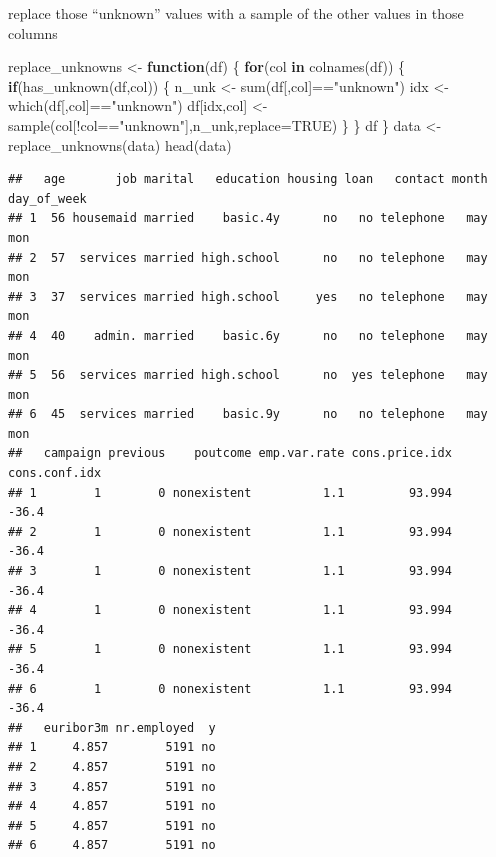 \documentclass[
]{article}
\newenvironment{Shaded}{\begin{snugshade}}{\end{snugshade}}
\newcommand{\AttributeTok}[1]{\textcolor[rgb]{0.77,0.63,0.00}{#1}}
\newcommand{\ConstantTok}[1]{\textcolor[rgb]{0.00,0.00,0.00}{#1}}
\newcommand{\ControlFlowTok}[1]{\textcolor[rgb]{0.13,0.29,0.53}{\textbf{#1}}}
\newcommand{\FunctionTok}[1]{\textcolor[rgb]{0.00,0.00,0.00}{#1}}
\newcommand{\NormalTok}[1]{#1}
\newcommand{\OtherTok}[1]{\textcolor[rgb]{0.56,0.35,0.01}{#1}}
\newcommand{\SpecialCharTok}[1]{\textcolor[rgb]{0.00,0.00,0.00}{#1}}
\newcommand{\StringTok}[1]{\textcolor[rgb]{0.31,0.60,0.02}{#1}}
\begin{document}
replace those ``unknown'' values with a sample of the other values in
those columns

\begin{Shaded}
\begin{Highlighting}[]
\NormalTok{replace\_unknowns }\OtherTok{\textless{}{-}} \ControlFlowTok{function}\NormalTok{(df) \{}
  \ControlFlowTok{for}\NormalTok{(col }\ControlFlowTok{in} \FunctionTok{colnames}\NormalTok{(df)) \{}
    \ControlFlowTok{if}\NormalTok{(}\FunctionTok{has\_unknown}\NormalTok{(df,col)) \{}
\NormalTok{      n\_unk }\OtherTok{\textless{}{-}} \FunctionTok{sum}\NormalTok{(df[,col]}\SpecialCharTok{==}\StringTok{"unknown"}\NormalTok{)}
\NormalTok{      idx }\OtherTok{\textless{}{-}} \FunctionTok{which}\NormalTok{(df[,col]}\SpecialCharTok{==}\StringTok{"unknown"}\NormalTok{)}
\NormalTok{      df[idx,col] }\OtherTok{\textless{}{-}} \FunctionTok{sample}\NormalTok{(col[}\SpecialCharTok{!}\NormalTok{col}\SpecialCharTok{==}\StringTok{"unknown"}\NormalTok{],n\_unk,}\AttributeTok{replace=}\ConstantTok{TRUE}\NormalTok{)}
\NormalTok{    \}}
\NormalTok{  \}}
\NormalTok{  df}
\NormalTok{\}}
\NormalTok{data }\OtherTok{\textless{}{-}} \FunctionTok{replace\_unknowns}\NormalTok{(data)}
\FunctionTok{head}\NormalTok{(data)}
\end{Highlighting}
\end{Shaded}

\begin{verbatim}
##   age       job marital   education housing loan   contact month day_of_week
## 1  56 housemaid married    basic.4y      no   no telephone   may         mon
## 2  57  services married high.school      no   no telephone   may         mon
## 3  37  services married high.school     yes   no telephone   may         mon
## 4  40    admin. married    basic.6y      no   no telephone   may         mon
## 5  56  services married high.school      no  yes telephone   may         mon
## 6  45  services married    basic.9y      no   no telephone   may         mon
##   campaign previous    poutcome emp.var.rate cons.price.idx cons.conf.idx
## 1        1        0 nonexistent          1.1         93.994         -36.4
## 2        1        0 nonexistent          1.1         93.994         -36.4
## 3        1        0 nonexistent          1.1         93.994         -36.4
## 4        1        0 nonexistent          1.1         93.994         -36.4
## 5        1        0 nonexistent          1.1         93.994         -36.4
## 6        1        0 nonexistent          1.1         93.994         -36.4
##   euribor3m nr.employed  y
## 1     4.857        5191 no
## 2     4.857        5191 no
## 3     4.857        5191 no
## 4     4.857        5191 no
## 5     4.857        5191 no
## 6     4.857        5191 no
\end{verbatim}
\end{document}
